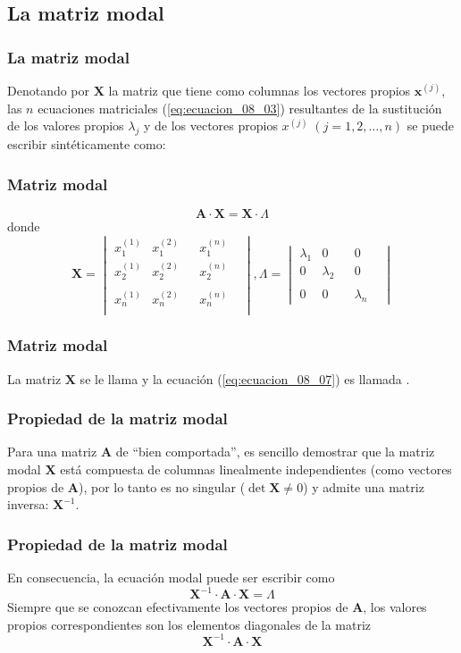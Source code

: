 \subsection*{La matriz modal}
\begin{frame}
\frametitle{La matriz modal}
Denotando por $\mathbf{X}$ la matriz que tiene como columnas los vectores propios $\mathbf{x}^{(j)}$, las $n$ ecuaciones matriciales (\ref{eq:ecuacion_08_03}) resultantes de la sustitución de los valores propios $\lambda_{j}$ y de los vectores propios $x^{(j)} \; (j = 1, 2, \ldots, n)$ se puede escribir sintéticamente como:
\end{frame}
\begin{frame}
\frametitle{Matriz modal}
\begin{equation}
\mathbf{A \cdot X} = \mathbf{X} \cdot \Lambda
\label{eq:ecuacion_08_07}
\end{equation}
\pause
donde
\begin{equation}
\mathbf{X} = \begin{vmatrix}
x_{1}^{(1)} & x_{1}^{(2)} &  & x_{1}^{(n)} \\
x_{2}^{(1)} & x_{2}^{(2)} &  & x_{2}^{(n)} \\
 & & & & \\
 x_{n}^{(1)} & x_{n}^{(2)} &  & x_{n}^{(n)} \\
\end{vmatrix},
\Lambda = 
\begin{vmatrix}
\lambda_{1} & 0 & & 0 \\
0 & \lambda_{2} & & 0 \\
 & & & & \\
 0 & 0 & & \lambda_{n}
\end{vmatrix}
\label{eq:ecuacion_08_08}
\end{equation}
\end{frame}
\begin{frame}
\frametitle{Matriz modal}
La matriz $\mathbf{X}$ se le llama  y la ecuación (\ref{eq:ecuacion_08_07}) es llamada .
\end{frame}
\begin{frame}
\frametitle{Propiedad de la matriz modal}
Para una matriz $\mathbf{A}$ de \enquote{bien comportada}, es sencillo demostrar que la matriz modal $\mathbf{X}$ está compuesta de columnas linealmente independientes (como vectores propios de $\mathbf{A}$), por lo tanto es no singular ($\det \mathbf{X} \neq 0$) y admite una matriz inversa: $\mathbf{X}^{-1}$.
\end{frame}
\begin{frame}
\frametitle{Propiedad de la matriz modal}
En consecuencia, la ecuación modal puede ser escribir como
\begin{equation}
\mathbf{X}^{-1} \cdot \mathbf{A} \cdot \mathbf{X} = \Lambda
\label{eq:ecuacion_08_09}
\end{equation}
\pause
Siempre que se conozcan efectivamente los vectores propios de $\mathbf{A}$, los valores propios correspondientes son los elementos diagonales de la matriz
\[ \mathbf{X}^{-1} \cdot \mathbf{A} \cdot \mathbf{X} \]
\end{frame}

